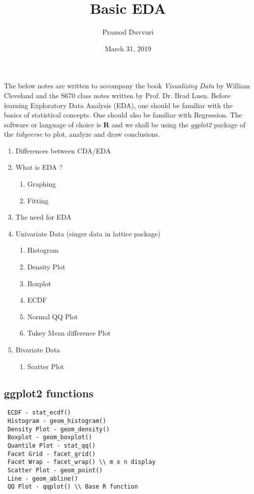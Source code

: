 \documentclass[11pt]{article}
\title{Basic EDA}
\author{Pramod Duvvuri}
\date{March 31, 2019}
\begin{document}
	\maketitle
	The below notes are written to accompany the book \textit{Visualizing Data} by William Cleveland and the S670 class notes written by Prof. Dr. Brad Luen. Before learning Exploratory Data Analysis (EDA), one should be familiar with the basics of statistical concepts. One should also be familiar with Regression. The software or language of choice is \textbf{R} and we shall be using the \textit{ggplot2} package of the \textit{tidyverse} to plot, analyze and draw conclusions.
	\begin{enumerate}
		\item Differences between CDA/EDA
		\item What is EDA ?
		\begin{enumerate}
			\item Graphing
			\item Fitting
		\end{enumerate}
	    \item The need for EDA
		\item Univariate Data (singer data in lattice package)
		\begin{enumerate}
			\item Histogram
			\item Density Plot
			\item Boxplot
			\item ECDF
			\item Normal QQ Plot
			\item Tukey Mean difference Plot
		\end{enumerate}
	\item Bivariate Data
	\begin{enumerate}
		\item Scatter Plot
	\end{enumerate}
	\end{enumerate}
\subsection*{ggplot2 functions}
\begin{verbatim}
 ECDF - stat_ecdf()
 Histogram - geom_histogram()
 Density Plot - geom_density()
 Boxplot - geom_boxplot()
 Quantile Plot - stat_qq()
 Facet Grid - facet_grid()
 Facet Wrap - facet_wrap() \\ m x n display
 Scatter Plot - geom_point()
 Line - geom_abline()
 QQ Plot - qqplot() \\ Base R function
\end{verbatim}
\end{document}
